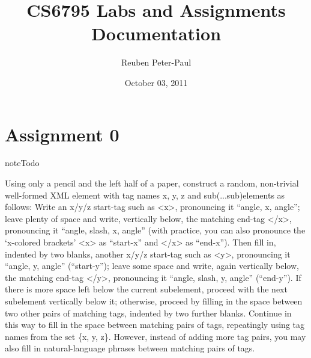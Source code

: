\documentclass[letterpaper,10pt,english]{sphinxmanual}
\title{CS6795 Labs and Assignments Documentation}
\date{October 03, 2011}
\author{Reuben Peter-Paul}
\begin{document}
\maketitle
\tableofcontents
{}\label{index::doc}



\chapter{Assignment 0}
\label{assign0:cs6795-labs-and-assignments}\label{assign0:assignment-0}\label{assign0::doc}
\begin{notice}{note}{Todo}

Using only a pencil and the left half of a paper, construct a random, non-trivial well-formed XML element with tag names x, y, z and sub(...sub)elements as follows: Write an x/y/z start-tag such as \textless{}x\textgreater{}, pronouncing it ``angle, x, angle''; leave plenty of space and write, vertically below, the matching end-tag \textless{}/x\textgreater{}, pronouncing it ``angle, slash, x, angle'' (with practice, you can also pronounce the `x-colored brackets' \textless{}x\textgreater{} as ``start-x'' and \textless{}/x\textgreater{} as ``end-x''). Then fill in, indented by two blanks, another x/y/z start-tag such as \textless{}y\textgreater{}, pronouncing it ``angle, y, angle'' (``start-y''); leave some space and write, again vertically below, the matching end-tag \textless{}/y\textgreater{}, pronouncing it ``angle, slash, y, angle'' (``end-y''). If there is more space left below the current subelement, proceed with the next subelement vertically below it; otherwise, proceed by filling in the space between two other pairs of matching tags, indented by two further blanks. Continue in this way to fill in the space between matching pairs of tags, repeatingly using tag names from the set \{x, y, z\}. However, instead of adding more tag pairs, you may also fill in natural-language phrases between matching pairs of tags.
\end{notice}
\end{document}
